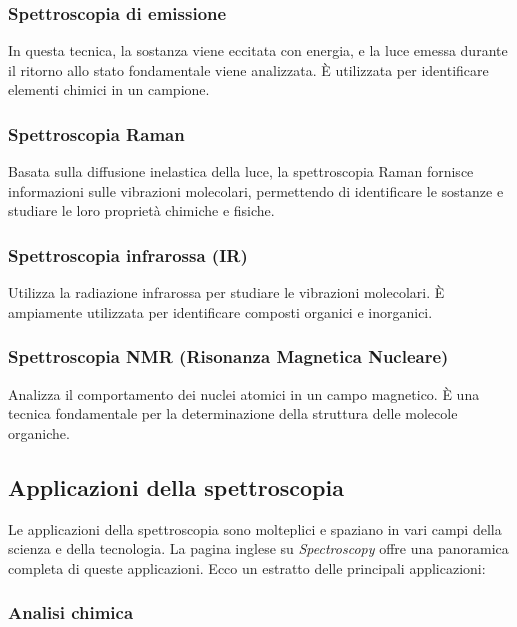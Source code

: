 \documentclass[12pt,a4paper]{report}
\begin{document}
\subsubsection{Spettroscopia di emissione}

In questa tecnica, la sostanza viene eccitata con energia, e la luce emessa durante il ritorno allo stato fondamentale viene analizzata. È utilizzata per identificare elementi chimici in un campione.

\subsubsection{Spettroscopia Raman}

Basata sulla diffusione inelastica della luce, la spettroscopia Raman fornisce informazioni sulle vibrazioni molecolari, permettendo di identificare le sostanze e studiare le loro proprietà chimiche e fisiche.

\subsubsection{Spettroscopia infrarossa (IR)}

Utilizza la radiazione infrarossa per studiare le vibrazioni molecolari. È ampiamente utilizzata per identificare composti organici e inorganici.

\subsubsection{Spettroscopia NMR (Risonanza Magnetica Nucleare)}

Analizza il comportamento dei nuclei atomici in un campo magnetico. È una tecnica fondamentale per la determinazione della struttura delle molecole organiche.

\subsection{Applicazioni della spettroscopia}

Le applicazioni della spettroscopia sono molteplici e spaziano in vari campi della scienza e della tecnologia. La pagina inglese su \textit{Spectroscopy} offre una panoramica completa di queste applicazioni. Ecco un estratto delle principali applicazioni:

\subsubsection{Analisi chimica}
\end{document}
